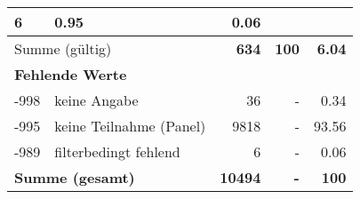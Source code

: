 \begin{longtable}{lXrrr}
       \num{6} &
       \num[round-mode=places,round-precision=2]{0.95} &
         \num[round-mode=places,round-precision=2]{0.06} \\
     \midrule
     \multicolumn{2}{l}{Summe (gültig)} &
       \textbf{\num{634}} &
     \textbf{\num{100}} &
       \textbf{\num[round-mode=places,round-precision=2]{6.04}} \\
     \multicolumn{5}{l}{\textbf{Fehlende Werte}}\\
       -998 &
       keine Angabe &
         \num{36} &
        - &
         \num[round-mode=places,round-precision=2]{0.34} \\
       -995 &
       keine Teilnahme (Panel) &
         \num{9818} &
        - &
         \num[round-mode=places,round-precision=2]{93.56} \\
       -989 &
       filterbedingt fehlend &
         \num{6} &
        - &
         \num[round-mode=places,round-precision=2]{0.06} \\
     \midrule
     \multicolumn{2}{l}{\textbf{Summe (gesamt)}} &
          \textbf{\num{10494}} &
        \textbf{-} &
        \textbf{\num{100}} \\
     \bottomrule
     \end{longtable}
     
